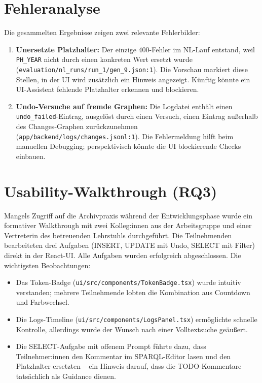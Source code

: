 \section{Fehleranalyse}

Die gesammelten Ergebnisse zeigen zwei relevante Fehlerbilder:
\begin{enumerate}
  \item \textbf{Unersetzte Platzhalter:} Der einzige 400-Fehler im NL-Lauf entstand, weil \texttt{PH\_YEAR} nicht durch einen konkreten Wert ersetzt wurde (\texttt{evaluation/nl\_runs/run\_1/gen\_9.json:1}). Die Vorschau markiert diese Stellen, in der UI wird zusätzlich ein Hinweis angezeigt. Künftig könnte ein UI-Assistent fehlende Platzhalter erkennen und blockieren.
  \item \textbf{Undo-Versuche auf fremde Graphen:} Die Logdatei enthält einen \texttt{undo\_failed}-Eintrag, ausgelöst durch einen Versuch, einen Eintrag außerhalb des Changes-Graphen zurückzunehmen (\texttt{app/backend/logs/changes.jsonl:1}). Die Fehlermeldung hilft beim manuellen Debugging; perspektivisch könnte die UI blockierende Checks einbauen.
\end{enumerate}

\section{Usability-Walkthrough (RQ3)}

Mangels Zugriff auf die Archivpraxis während der Entwicklungsphase wurde ein formativer Walkthrough mit zwei Kolleg:innen aus der Arbeitsgruppe und einer Vertreterin des betreuenden Lehrstuhls durchgeführt. Die Teilnehmenden bearbeiteten drei Aufgaben (INSERT, UPDATE mit Undo, SELECT mit Filter) direkt in der React-UI. Alle Aufgaben wurden erfolgreich abgeschlossen. Die wichtigsten Beobachtungen:

\begin{itemize}
  \item Das Token-Badge (\texttt{ui/src/components/TokenBadge.tsx}) wurde intuitiv verstanden; mehrere Teilnehmende lobten die Kombination aus Countdown und Farbwechsel.
  \item Die Logs-Timeline (\texttt{ui/src/components/LogsPanel.tsx}) ermöglichte schnelle Kontrolle, allerdings wurde der Wunsch nach einer Volltextsuche geäußert.
  \item Die SELECT-Aufgabe mit offenem Prompt führte dazu, dass Teilnehmer:innen den Kommentar im SPARQL-Editor lasen und den Platzhalter ersetzten – ein Hinweis darauf, dass die TODO-Kommentare tatsächlich als Guidance dienen.
\end{itemize}

